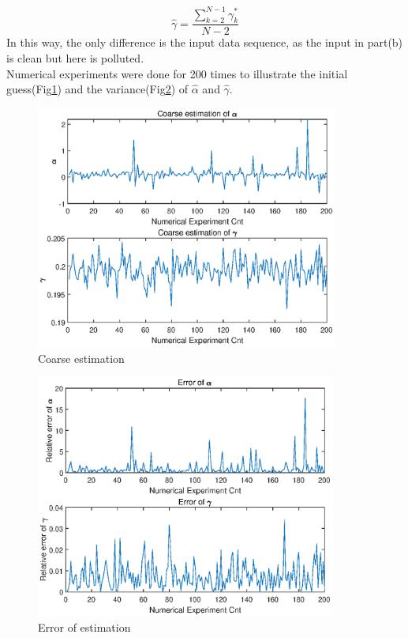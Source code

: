 \documentclass[paper=a4, fontsize=11pt]{scrartcl} %
\numberwithin{equation}{section} %
\numberwithin{figure}{section} %
\numberwithin{table}{section} %
\begin{document}
\begin{enumerate}[(a)]
\begin{equation}
				\hat{\gamma} = \frac{\sum_{k=2}^{N-1}\gamma_k^*}{N-2}
			\end{equation}
			In this way, the only difference is the input data sequence, as the input in part(b) is clean but here is polluted. \\
			Numerical experiments were done for 200 times to illustrate the initial guess(Fig\ref{coarse_ag}) and the variance(Fig\ref{err_ag}) of $\hat{\alpha}$ and $\hat{\gamma}$.
			\begin{figure}\centering
				\includegraphics[height=8cm]{../pic/coarse_estimation.eps}
				\caption{Coarse estimation} 
				\label{coarse_ag}
			\end{figure}
			\begin{figure}\centering
				\includegraphics[height=8cm]{../pic/coarse_estimation_err.eps}
				\caption{Error of estimation}
				\label{err_ag}
			\end{figure}
		

\end{enumerate}
\end{document}

